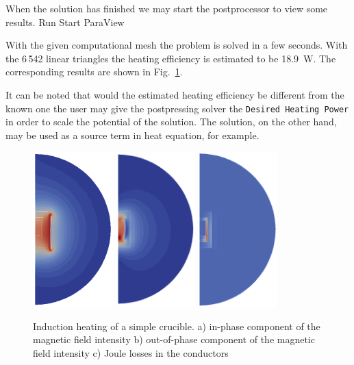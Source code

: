 When the solution has finished we may start the postprocessor to view some results.
\ttbegin
Run
  Start ParaView
\ttend


With the given computational mesh the problem is solved in 
a few seconds. With the 6\,542 linear triangles the heating
efficiency is estimated to be 18.9~W. The corresponding results are shown
in Fig.~\ref{fig:ind_heat1}.

It can be noted that would the estimated heating efficiency be different from the known one
the user may give the postpressing solver the \texttt{Desired Heating Power} in order to scale 
the potential of the solution. The solution, on the other hand, may be used as a source term 
in heat equation, for example. 

\begin{figure}
\begin{center}
  \includegraphics[height=60mm]{Induction_B_re}
  \includegraphics[height=60mm]{Induction_B_im}
  \includegraphics[height=60mm]{Induction_Joule_heating}


\end{center}
\caption{Induction heating of a simple crucible. 
a) in-phase component of the magnetic field intensity
b) out-of-phase component of the magnetic field intensity
c) Joule losses in the conductors}
\label{fig:ind_heat1}
\end{figure}

